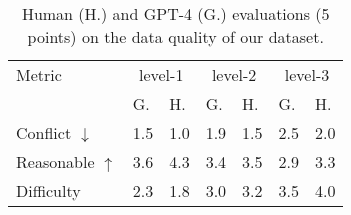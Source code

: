 \begin{table}
\small
\centering
\begin{tabular}{l|ll|ll|ll} 
\toprule
 Metric & \multicolumn{2}{c|}{level-1} & \multicolumn{2}{c|}{level-2} & \multicolumn{2}{c}{level-3}  \\
    & G.  & H.                    & G.  & H.                    & G.  & H.                     \\ 
\midrule
Conflict $\downarrow$  & 1.5 & 1.0                   & 1.9 & 1.5                   & 2.5 & 2.0                    \\
Reasonable $\uparrow$  & 3.6 & 4.3                   & 3.4 & 3.5                   & 2.9 & 3.3                    \\
Difficulty  & 2.3 & 1.8                   & 3.0 & 3.2                   & 3.5 & 4.0                    \\
\bottomrule
\end{tabular}
\caption{Human (H.) and GPT-4 (G.) evaluations (5 points) on the data quality of our \dataset dataset.}
\label{tab:human-gpt}
\end{table}
